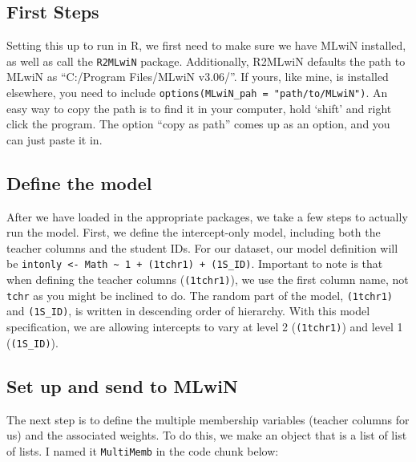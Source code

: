 \documentclass[
]{book}
\begin{document}
\hypertarget{first-steps}{%
\subsection{First Steps}\label{first-steps}}

Setting this up to run in R, we first need to make sure we have MLwiN installed, as well as call the \texttt{R2MLwiN} package. Additionally, R2MLwiN defaults the path to MLwiN as ``C:/Program Files/MLwiN v3.06/''. If yours, like mine, is installed elsewhere, you need to include \texttt{options(MLwiN\_pah\ =\ "path/to/MLwiN")}. An easy way to copy the path is to find it in your computer, hold `shift' and right click the program. The option ``copy as path'' comes up as an option, and you can just paste it in.

\hypertarget{define-the-model}{%
\subsection{Define the model}\label{define-the-model}}

After we have loaded in the appropriate packages, we take a few steps to actually run the model. First, we define the intercept-only model, including both the teacher columns and the student IDs. For our dataset, our model definition will be \texttt{intonly\ \textless{}-\ Math\ \textasciitilde{}\ 1\ +\ (1\textbar{}tchr1)\ +\ (1\textbar{}S\_ID)}. Important to note is that when defining the teacher columns (\texttt{(1\textbar{}tchr1)}), we use the first column name, not \texttt{tchr} as you might be inclined to do. The random part of the model, \texttt{(1\textbar{}tchr1)} and \texttt{(1\textbar{}S\_ID)}, is written in descending order of hierarchy. With this model specification, we are allowing intercepts to vary at level 2 (\texttt{(1\textbar{}tchr1)}) and level 1 (\texttt{(1\textbar{}S\_ID)}).

\hypertarget{set-up-and-send-to-mlwin}{%
\subsection{Set up and send to MLwiN}\label{set-up-and-send-to-mlwin}}

The next step is to define the multiple membership variables (teacher columns for us) and the associated weights. To do this, we make an object that is a list of list of lists. I named it \texttt{MultiMemb} in the code chunk below:
\end{document}
